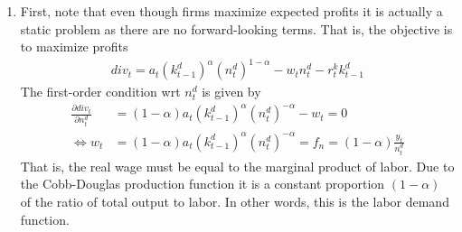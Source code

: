 \begin{enumerate}
(I) and (III) in (IV) yields
\begin{align*}
\underbrace{\gamma c_t^{-1}}_{U_{c,t}} &= \beta \mathbb{E}_{t} \underbrace{\gamma c_{t+1}^{-1}}_{U_{c,t+1}}\left(1 - \delta + r^{k}_{t+1}\right)
\end{align*}
This is the Euler equation of \textbf{intertemporal optimality}.
It reflects the trade-off between consumption and savings.
If the household saves a (marginal) unit of consumption, i.e.\ they invest this into the capital stock,
  they can consume the saved \((1-\delta+r^{k}_{t+1})\) units in the following period.
The marginal utility of consuming a unit today is equal to \(U_{c,t}\),
  whereas consuming tomorrow has expected utility equal to \(\mathbb{E}_{t}(U_{c,t+1})\).
Discounting expected marginal utility with \(\beta \),
  an optimum is characterized by a situation
  in which the household must be indifferent between both choices.

(I) in (II) yields:
\begin{align*}
w_t = -\frac{\frac{-\psi}{1-n_t}}{\gamma c_t^{-1}} \equiv - \frac{U_{n,t}}{U_{c,t}}
\end{align*}
This equation reflects \textbf{intratemporal optimality}; in other words, the labor supply function.
According to the equation, the real wage must be equal to the marginal rate of substitution between consumption and leisure.

\item
First, note that even though firms maximize expected profits
  it is actually a static problem as there are no forward-looking terms.
That is, the objective is to maximize profits
\begin{align*}
{div}_t = a_t {(k^{d}_{t-1})}^{\alpha} {(n^{d}_{t})}^{1-\alpha} - w_t n^{d}_{t} - r^{k}_{t} k^{d}_{t-1}
\end{align*}
The first-order condition wrt \(n^{d}_{t}\) is given by
\begin{align*}
\frac{\partial {div}_t}{\partial n^{d}_{t}} &= (1-\alpha) a_t {(k^{d}_{t-1})}^{\alpha} {(n^{d}_{t})}^{-\alpha} - w_t = 0
\\
\Leftrightarrow w_t &= (1-\alpha) a_t {(k^{d}_{t-1})}^{\alpha} {(n^{d}_{t})}^{-\alpha} = f_n = (1-\alpha) \frac{y_t}{n^{d}_{t}}
\end{align*}
That is, the real wage must be equal to the marginal product of labor.
Due to the Cobb-Douglas production function it is a constant proportion \((1-\alpha)\) of the ratio of total output to labor.
In other words, this is the labor demand function.
				

\end{enumerate}
